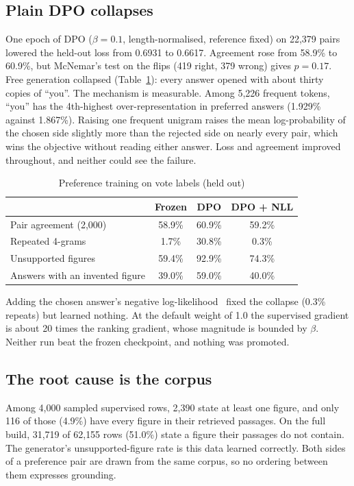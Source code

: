\documentclass[conference]{IEEEtran}
\begin{document}
\subsection{Plain DPO collapses}
One epoch of DPO ($\beta = 0.1$, length-normalised, reference fixed) on 22{,}379 pairs lowered the
held-out loss from 0.6931 to 0.6617. Agreement rose from 58.9\% to 60.9\%, but McNemar's test on the
flips (419 right, 379 wrong) gives $p = 0.17$. Free generation collapsed (Table~\ref{tab:dpo}): every
answer opened with about thirty copies of ``you''. The mechanism is measurable. Among 5{,}226 frequent
tokens, ``you'' has the 4th-highest over-representation in preferred answers (1.929\% against
1.867\%). Raising one frequent unigram raises the mean log-probability of the chosen side slightly
more than the rejected side on nearly every pair, which wins the objective without reading either
answer. Loss and agreement improved throughout, and neither could see the failure.

\begin{table}[t]
\centering
\caption{Preference training on vote labels (held out)}
\label{tab:dpo}
\begin{tabular}{@{}lccc@{}}
\toprule
 & Frozen & DPO & DPO + NLL \\
\midrule
Pair agreement (2{,}000) & 58.9\% & 60.9\% & 59.2\% \\
Repeated 4-grams & 1.7\% & 30.8\% & 0.3\% \\
Unsupported figures & 59.4\% & 92.9\% & 74.3\% \\
Answers with an invented figure & 39.0\% & 59.0\% & 40.0\% \\
\bottomrule
\end{tabular}
\end{table}

Adding the chosen answer's negative log-likelihood~\cite{pang2024rpo} fixed the collapse (0.3\%
repeats) but learned nothing. At the default weight of 1.0 the supervised gradient is about 20 times
the ranking gradient, whose magnitude is bounded by $\beta$. Neither run beat the frozen checkpoint,
and nothing was promoted.

\subsection{The root cause is the corpus}
Among 4{,}000 sampled supervised rows, 2{,}390 state at least one figure, and only 116 of those
(4.9\%) have every figure in their retrieved passages. On the full build, 31{,}719 of 62{,}155 rows
(51.0\%) state a figure their passages do not contain. The generator's unsupported-figure rate is
this data learned correctly. Both sides of a preference pair are drawn from the same corpus, so no
ordering between them expresses grounding.
\end{document}
